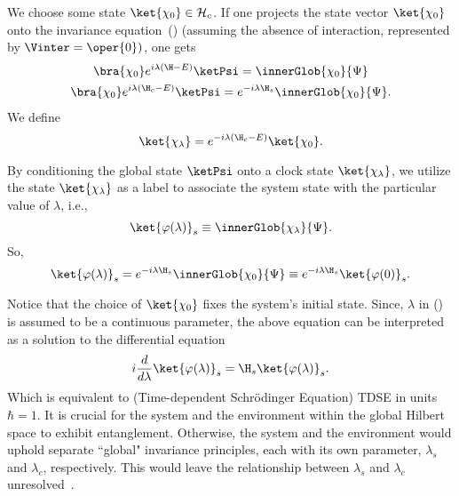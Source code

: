 We choose some state \(\ket{\chi_0} \in \mathcal{H}_c\). If one projects the state vector \(\ket{\chi_0}\) onto the invariance equation~() (assuming the absence of interaction, represented by \(\Vinter = \oper{0})\), one gets
\begin{equation}
\begin{gathered}
\bra{\chi_0}e^{i\lambda(\H - E)}\ketPsi = \innerGlob{\chi_0}{\Psi}\\
\bra{\chi_0}e^{i\lambda(\H_c - E)}\ketPsi =e^{-i\lambda \H_s}  \innerGlob{\chi_0}{\Psi}.
\end{gathered}
\end{equation}
We define
\begin{equation}
   \ket{\chi_\lambda} = e^{-i\lambda(\H_c - E)}\ket{\chi_0}.
\end{equation}

By conditioning the global state \(\ketPsi\) onto a clock state \(\ket{\chi_\lambda}\),
we utilize the state \(\ket{\chi_\lambda}\) as a label to associate the system state with the particular value of \(\lambda\), i.e., 
\begin{equation}
    \label{eq:nonint_sys_evol}
    \ket{\varphi(\lambda)}_s \equiv \innerGlob{\chi_\lambda}{\Psi}.
\end{equation}
So, 
\begin{equation}
\label{eq:nonint_sys_evol}
    \ket{\varphi(\lambda)}_s = e^{-i\lambda \H_s} \innerGlob{\chi_0}{\Psi} \equiv e^{-i\lambda \H_s}\ket{\varphi(0)}_s.
\end{equation}

Notice that the choice of \(\ket{\chi_0}\) fixes the system's initial state.
Since, \(\lambda\) in () is assumed to be a continuous 
 parameter, the above equation can be interpreted as a solution to the differential equation
\begin{equation}
    i \dfrac{d}{d\lambda} \ket{\varphi(\lambda)}_s = \H_s \ket{\varphi(\lambda)}_s.
\end{equation}
Which is equivalent to (Time-dependent Schr\"odinger Equation) TDSE in units 
\(\hbar = 1\). It is crucial for the system and the environment within the global Hilbert space to exhibit entanglement. Otherwise, the system and the environment would uphold separate ``global" invariance principles, each with its own parameter, \(\lambda_s\) and \(\lambda_c\), respectively. This would leave the relationship between \(\lambda_s\) and \(\lambda_c\) unresolved~\cite{Gemsheim:2023izg}.

